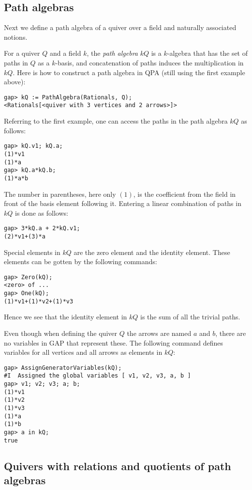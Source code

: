 \documentclass{amsart}
\theoremstyle{definition}
\theoremstyle{theoretic}
\begin{document}
\subsection{Path algebras} Next we define a path algebra of a quiver
over a field and naturally associated notions. 

For a quiver $Q$ and a field $k$, the \emph{path algebra} $kQ$ is a
$k$-algebra that has the set of paths in $Q$ as a $k$-basis, and
concatenation of paths induces the multiplication in $kQ$.  Here is
how to construct a path algebra in QPA (still using the first example
above): 
\begin{verbatim}
gap> kQ := PathAlgebra(Rationals, Q);
<Rationals[<quiver with 3 vertices and 2 arrows>]>
\end{verbatim}
Referring to the first example, one can access the paths in the path
algebra $kQ$ as follows:
\begin{verbatim}
gap> kQ.v1; kQ.a; 
(1)*v1
(1)*a
gap> kQ.a*kQ.b;
(1)*a*b
\end{verbatim}
The number in parentheses, here only $(1)$, is the coefficient from
the field in front of the basis element following it.  Entering a
linear combination of paths in $kQ$ is done as follows:
\begin{verbatim}
gap> 3*kQ.a + 2*kQ.v1;
(2)*v1+(3)*a
\end{verbatim} 
Special elements in $kQ$ are the zero element and the identity
element.  These elements can be gotten by the following commands:
\begin{verbatim}
gap> Zero(kQ);
<zero> of ...
gap> One(kQ);
(1)*v1+(1)*v2+(1)*v3
\end{verbatim}
Hence we see that the identity element in $kQ$ is the sum of all the
trivial paths. 

Even though when defining the quiver $Q$ the arrows are named $a$ and
$b$, there are no variables in GAP that represent these.  The
following command defines variables for all vertices and all
arrows as elements in $kQ$:
\begin{verbatim}
gap> AssignGeneratorVariables(kQ);
#I  Assigned the global variables [ v1, v2, v3, a, b ]
gap> v1; v2; v3; a; b;
(1)*v1
(1)*v2
(1)*v3
(1)*a
(1)*b
gap> a in kQ;
true
\end{verbatim}

\subsection{Quivers with relations and quotients of path algebras}
\end{document}
